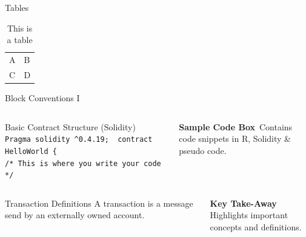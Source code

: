 \documentclass[handout]{beamer}
\begin{document}
\begin{frame}{Tables}
	\begin{table}
		\begin{tabular}{ll}
			A & B\\
			C & D
		\end{tabular}
		\caption{This is a table}
		\label{tbl:simpletable}
	\end{table}
\end{frame}


\begin{frame}{Block Conventions I}
	
	\begin{columns}[T]
		\begin{column}{0.45\textwidth}
			\vspace{-1.0em}
			\begin{exampleblock}{Basic Contract Structure (Solidity)}
	 			\texttt{
					Pragma solidity  \textasciicircum 0.4.19; \
					contract HelloWorld \{ \\
					\color{softanthracite} /* This is where you write your code */
	 			}
			\end{exampleblock}			
		\end{column} %
		\begin{column}{0.5\textwidth}
			\textbf{Sample Code Box}\
			Contains code snippets in R, Solidity \& pseudo code.
		\end{column}
	\end{columns}

\vspace{2.0em}

	\begin{columns}[T]
		\begin{column}{0.45\textwidth}
			\vspace{-1.0em}
			\begin{alertblock}{Transaction Definitions}
				A transaction is a message send by an externally owned account.
			\end{alertblock}		
		\end{column}
		\begin{column}{0.5\textwidth}
			\textbf{Key Take-Away}\\
			Highlights important concepts and definitions.
		\end{column}
	\end{columns}

\vspace{2.0em}


\end{frame}
\end{document}
